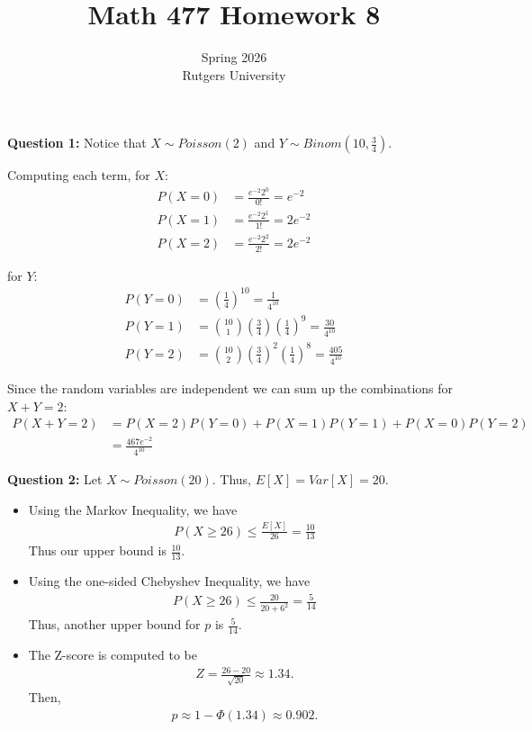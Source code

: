 \documentclass[12pt]{article}
\title{Math 477 Homework 8}
\author{Spring 2026 \\ Rutgers University}
\begin{document}
\maketitle

\noindent{}\textbf{Question 1:}
Notice that $X \sim Poisson(2)$ and $Y \sim Binom(10, \frac{3}{4})$.

Computing each term,
for $X$:
\begin{align*}
    P(X = 0) & = \frac{e^{-2}2^0}{0!} = e^{-2}  \\
    P(X = 1) & = \frac{e^{-2}2^1}{1!} = 2e^{-2} \\
    P(X = 2) & = \frac{e^{-2}2^2}{2!} = 2e^{-2}
\end{align*}

for $Y$:
\begin{align*}
    P(Y = 0) & = (\frac{1}{4})^{10} = \frac{1}{4^{10}}                                  \\
    P(Y = 1) & = \binom{10}{1} (\frac{3}{4}) (\frac{1}{4})^{9} = \frac{30}{4^{10}}      \\
    P(Y = 2) & = \binom{10}{2} (\frac{3}{4})^{2} (\frac{1}{4})^{8} = \frac{405}{4^{10}}
\end{align*}

Since the random variables are independent we can sum up the combinations for $X + Y = 2$:
\begin{align*}
    P(X + Y = 2) & = P(X=2) P(Y=0) + P(X=1) P(Y=1) + P(X=0) P(Y=2) \\
                 & = \frac{467e^{-2}}{4^{10}}
\end{align*}

\noindent{}\textbf{Question 2:}
Let $X \sim Poisson(20)$. Thus, $E[X] = Var[X] = 20$.
\begin{itemize}
    \item [(a)]
          Using the Markov Inequality, we have
          \begin{align*}
              P(X \geq 26) \leq \frac{E[X]}{26} = \frac{10}{13}
          \end{align*}
          Thus our upper bound is $\frac{10}{13}$.

    \item [(b)]
          Using the one-sided Chebyshev Inequality, we have
          \begin{align*}
              P(X \geq 26) \leq \frac{20}{20 + 6^2} = \frac{5}{14}
          \end{align*}
          Thus, another upper bound for $p$ is $\frac{5}{14}$.

    \item [(c)]
          The Z-score is computed to be
          \begin{align*}
              Z = \frac{26-20}{\sqrt{20}} \approx 1.34.
          \end{align*}
          Then,
          \begin{align*}
              p \approx 1 - \Phi(1.34) \approx 0.902.
          \end{align*}
\end{itemize}
\end{document}
